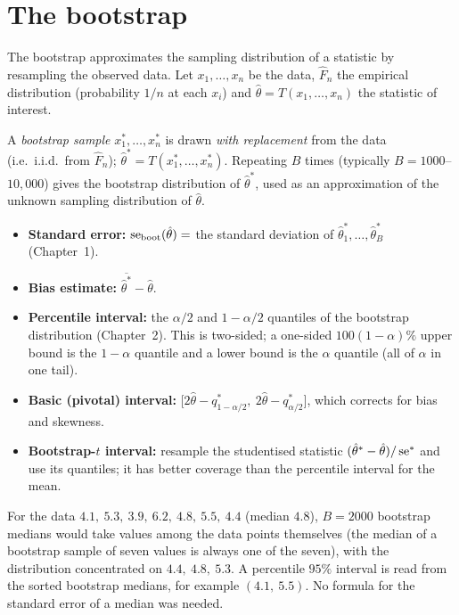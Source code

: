 \section{The bootstrap}

The bootstrap approximates the sampling distribution of a statistic by resampling the observed data. Let $x_1,\dots,x_n$ be the data, $\hat F_n$ the empirical distribution (probability $1/n$ at each $x_i$) and $\hat\theta=T(x_1,\dots,x_n)$ the statistic of interest.

\begin{definition}
A \emph{bootstrap sample} $x_1^*,\dots,x_n^*$ is drawn \emph{with replacement} from the data (i.e.\ i.i.d.\ from $\hat F_n$); $\hat\theta^*=T(x_1^*,\dots,x_n^*)$. Repeating $B$ times (typically $B=1000$--$10{,}000$) gives the bootstrap distribution of $\hat\theta^*$, used as an approximation of the unknown sampling distribution of $\hat\theta$.
\end{definition}

\begin{itemize}
  \item \textbf{Standard error:} $\operatorname{se}_{\mathrm{boot}}(\hat\theta)=$ the standard deviation of $\hat\theta^*_1,\dots,\hat\theta^*_B$ (Chapter~1).
  \item \textbf{Bias estimate:} $\overline{\hat\theta^*}-\hat\theta$.
  \item \textbf{Percentile interval:} the $\alpha/2$ and $1-\alpha/2$ quantiles of the bootstrap distribution (Chapter~2). This is two-sided; a one-sided $100(1-\alpha)\%$ upper bound is the $1-\alpha$ quantile and a lower bound is the $\alpha$ quantile (all of $\alpha$ in one tail).
  \item \textbf{Basic (pivotal) interval:} $\big[2\hat\theta-q^*_{1-\alpha/2},\ 2\hat\theta-q^*_{\alpha/2}\big]$, which corrects for bias and skewness.
  \item \textbf{Bootstrap-$t$ interval:} resample the studentised statistic $(\hat\theta^*-\hat\theta)/\operatorname{se}^*$ and use its quantiles; it has better coverage than the percentile interval for the mean.
\end{itemize}

\begin{example}
For the data $4.1,\ 5.3,\ 3.9,\ 6.2,\ 4.8,\ 5.5,\ 4.4$ (median $4.8$), $B=2000$ bootstrap medians would take values among the data points themselves (the median of a bootstrap sample of seven values is always one of the seven), with the distribution concentrated on $4.4,\ 4.8,\ 5.3$. A percentile $95\%$ interval is read from the sorted bootstrap medians, for example $(4.1,\ 5.5)$. No formula for the standard error of a median was needed.
\end{example}


